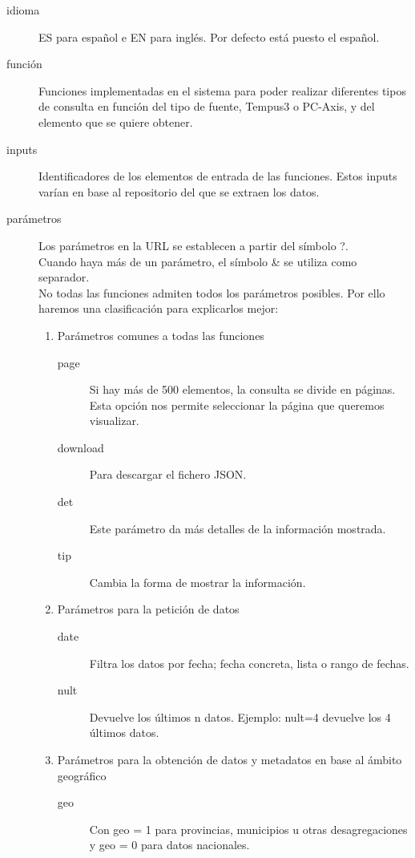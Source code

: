 \begin{description}
	\item [idioma] ES para español e EN para inglés. Por defecto está puesto el español.\\
	\item [función] Funciones implementadas en el sistema para poder realizar diferentes tipos de consulta en función del tipo de fuente, Tempus3 o PC-Axis, y del elemento que se quiere obtener.
    \item [inputs] Identificadores de los elementos de entrada de las funciones. Estos inputs varían en base al repositorio del que se extraen los datos.
    \item [parámetros] Los parámetros en la URL se establecen a partir del símbolo ?.\\
    Cuando haya más de un parámetro, el símbolo \& se utiliza como separador.\\
    No todas las funciones admiten todos los parámetros posibles. Por ello haremos una clasificación para explicarlos mejor:  
     \begin{enumerate}
        \item Parámetros comunes a todas las funciones
            \begin{description}
            \item [page] Si hay más de 500 elementos, la consulta se divide en páginas. Esta opción nos permite seleccionar la página que queremos visualizar.
            \item [download] Para descargar el fichero JSON.
            \item [det] Este parámetro da más detalles de la información mostrada.
            \item [tip] Cambia la forma de mostrar la información.
            \end{description}
        \item Parámetros para la petición de datos
            \begin{description}
                \item [date] Filtra los datos por fecha; fecha concreta, lista o rango de fechas.
                \item [nult] Devuelve los últimos n datos. Ejemplo: nult=4 devuelve los 4 últimos datos.
            \end{description}
        \item Parámetros para la obtención de datos y metadatos en base al ámbito geográfico
            \begin{description}
                \item [geo] Con geo = 1 para provincias, municipios u otras desagregaciones y geo = 0 para datos nacionales.
            \end{description}
        \end{enumerate}
\end{description}

